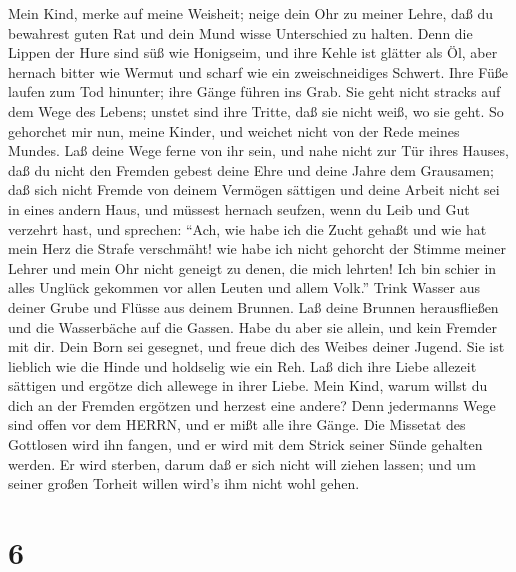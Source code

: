  Mein Kind, merke auf meine Weisheit; neige dein Ohr zu
meiner Lehre,  daß du bewahrest guten Rat und dein Mund
wisse Unterschied zu halten.  Denn die Lippen der Hure sind
süß wie Honigseim, und ihre Kehle ist glätter als Öl,  aber
hernach bitter wie Wermut und scharf wie ein zweischneidiges Schwert.
 Ihre Füße laufen zum Tod hinunter; ihre Gänge führen ins
Grab.  Sie geht nicht stracks auf dem Wege des Lebens;
unstet sind ihre Tritte, daß sie nicht weiß, wo sie geht. 
So gehorchet mir nun, meine Kinder, und weichet nicht von der Rede
meines Mundes.  Laß deine Wege ferne von ihr sein, und nahe
nicht zur Tür ihres Hauses,  daß du nicht den Fremden gebest
deine Ehre und deine Jahre dem Grausamen;  daß sich nicht
Fremde von deinem Vermögen sättigen und deine Arbeit nicht sei in eines
andern Haus,  und müssest hernach seufzen, wenn du Leib und
Gut verzehrt hast,  und sprechen: ``Ach, wie habe ich die
Zucht gehaßt und wie hat mein Herz die Strafe verschmäht! 
wie habe ich nicht gehorcht der Stimme meiner Lehrer und mein Ohr nicht
geneigt zu denen, die mich lehrten!  Ich bin schier in
alles Unglück gekommen vor allen Leuten und allem Volk.'' 
Trink Wasser aus deiner Grube und Flüsse aus deinem Brunnen.
 Laß deine Brunnen herausfließen und die Wasserbäche auf
die Gassen.  Habe du aber sie allein, und kein Fremder mit
dir.  Dein Born sei gesegnet, und freue dich des Weibes
deiner Jugend.  Sie ist lieblich wie die Hinde und
holdselig wie ein Reh. Laß dich ihre Liebe allezeit sättigen und ergötze
dich allewege in ihrer Liebe.  Mein Kind, warum willst du
dich an der Fremden ergötzen und herzest eine andere?  Denn
jedermanns Wege sind offen vor dem HERRN, und er mißt alle ihre Gänge.
 Die Missetat des Gottlosen wird ihn fangen, und er wird
mit dem Strick seiner Sünde gehalten werden.  Er wird
sterben, darum daß er sich nicht will ziehen lassen; und um seiner
großen Torheit willen wird's ihm nicht wohl gehen.

\hypertarget{section-5}{%
\section{6}\label{section-5}}

